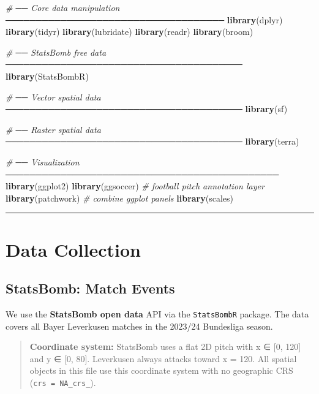 \documentclass[
]{article}
\newenvironment{Shaded}{\begin{snugshade}}{\end{snugshade}}
\newcommand{\CommentTok}[1]{\textcolor[rgb]{0.56,0.35,0.01}{\textit{#1}}}
\newcommand{\FunctionTok}[1]{\textcolor[rgb]{0.13,0.29,0.53}{\textbf{#1}}}
\newcommand{\NormalTok}[1]{#1}
\begin{document}
\begin{Shaded}
\begin{Highlighting}[]
\CommentTok{\# ── Core data manipulation ────────────────────────────────────}
\FunctionTok{library}\NormalTok{(dplyr)}
\FunctionTok{library}\NormalTok{(tidyr)}
\FunctionTok{library}\NormalTok{(lubridate)}
\FunctionTok{library}\NormalTok{(readr)}
\FunctionTok{library}\NormalTok{(broom)}

\CommentTok{\# ── StatsBomb free data ───────────────────────────────────────}
\FunctionTok{library}\NormalTok{(StatsBombR)}

\CommentTok{\# ── Vector spatial data ───────────────────────────────────────}
\FunctionTok{library}\NormalTok{(sf)}

\CommentTok{\# ── Raster spatial data ───────────────────────────────────────}
\FunctionTok{library}\NormalTok{(terra)}

\CommentTok{\# ── Visualization ─────────────────────────────────────────────}
\FunctionTok{library}\NormalTok{(ggplot2)}
\FunctionTok{library}\NormalTok{(ggsoccer)   }\CommentTok{\# football pitch annotation layer}
\FunctionTok{library}\NormalTok{(patchwork)  }\CommentTok{\# combine ggplot panels}
\FunctionTok{library}\NormalTok{(scales)}
\end{Highlighting}
\end{Shaded}

\begin{center}\rule{0.5\linewidth}{0.5pt}\end{center}

\section{Data Collection}\label{data-collection}

\subsection{StatsBomb: Match Events}\label{statsbomb-match-events}

We use the \textbf{StatsBomb open data} API via the \texttt{StatsBombR}
package. The data covers all Bayer Leverkusen matches in the 2023/24
Bundesliga season.

\begin{quote}
\textbf{Coordinate system:} StatsBomb uses a flat 2D pitch with x ∈
{[}0, 120{]} and y ∈ {[}0, 80{]}. Leverkusen always attacks toward x =
120. All spatial objects in this file use this coordinate system with no
geographic CRS (\texttt{crs\ =\ NA\_crs\_}).
\end{quote}
\end{document}
